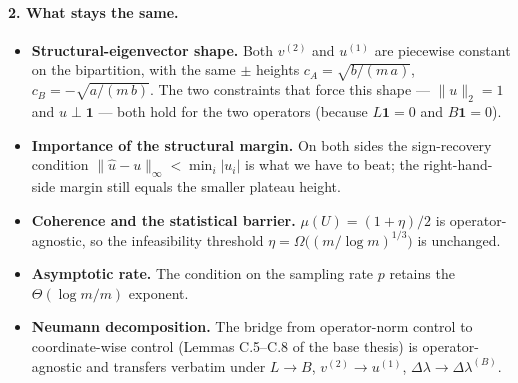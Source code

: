 \documentclass[11pt]{article}
\theoremstyle{remark}
\newcommand{\1}{\mathbf{1}}
\newcommand{\Bop}{B}
\begin{document}
\paragraph{2. What stays the same.}
\begin{itemize}
  \item \textbf{Structural-eigenvector shape.}
        Both $v^{(2)}$ and $u^{(1)}$ are piecewise constant on the
        bipartition, with the same $\pm$ heights
        \;$c_{A} = \sqrt{b/(m\,a)}$,\; $c_{B} = -\sqrt{a/(m\,b)}$.
        The two constraints that force this shape --- $\|u\|_{2} = 1$
        and $u \perp \1$ --- both hold for the two operators (because
        $L\1 = 0$ and $\Bop \1 = 0$).
  \item \textbf{Importance of the structural margin.}
        On both sides the sign-recovery condition $\|\widehat u -
        u\|_{\infty} < \min_{i} |u_{i}|$ is what we have to beat; the
        right-hand-side margin still equals the smaller plateau height.
  \item \textbf{Coherence and the statistical barrier.}
        \;$\mu(U) = (1+\eta)/2$ \;is operator-agnostic, so the
        infeasibility threshold $\eta = \Omega\bigl((m/\log m)^{1/3}\bigr)$
        is unchanged.
  \item \textbf{Asymptotic rate.}
        The condition on the sampling rate $p$ retains the
        $\Theta(\log m / m)$ exponent.
  \item \textbf{Neumann decomposition.}
        The bridge from operator-norm control to coordinate-wise control
        (Lemmas C.5--C.8 of the base thesis) is operator-agnostic and
        transfers verbatim under $L \to \Bop$, $v^{(2)} \to u^{(1)}$,
        $\Delta\lambda \to \Delta\lambda^{(B)}$.
\end{itemize}
\end{document}
